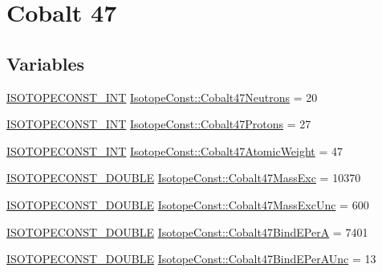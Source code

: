\hypertarget{group___isotope_const-_cobalt-_co47}{}\section{Cobalt 47}
\label{group___isotope_const-_cobalt-_co47}
\subsection*{Variables}
\begin{DoxyCompactItemize}
\item 
\mbox{\hyperlink{group___isotope_const-_macros_ga5f18360b3e99483a35c32d789e62621c}{I\+S\+O\+T\+O\+P\+E\+C\+O\+N\+S\+T\+\_\+\+I\+NT}} \mbox{\hyperlink{group___isotope_const-_cobalt-_co47_gabe5a80fa1a292359e2497542a5131662}{Isotope\+Const\+::\+Cobalt47\+Neutrons}} = 20
\item 
\mbox{\hyperlink{group___isotope_const-_macros_ga5f18360b3e99483a35c32d789e62621c}{I\+S\+O\+T\+O\+P\+E\+C\+O\+N\+S\+T\+\_\+\+I\+NT}} \mbox{\hyperlink{group___isotope_const-_cobalt-_co47_gae44eb3ae1e4d620cf5007c723a5c1a70}{Isotope\+Const\+::\+Cobalt47\+Protons}} = 27
\item 
\mbox{\hyperlink{group___isotope_const-_macros_ga5f18360b3e99483a35c32d789e62621c}{I\+S\+O\+T\+O\+P\+E\+C\+O\+N\+S\+T\+\_\+\+I\+NT}} \mbox{\hyperlink{group___isotope_const-_cobalt-_co47_ga0cd20710c3cc124bdc234155502d5517}{Isotope\+Const\+::\+Cobalt47\+Atomic\+Weight}} = 47
\item 
\mbox{\hyperlink{group___isotope_const-_macros_ga8f45a7272ce02c0b4c65c44636ed719a}{I\+S\+O\+T\+O\+P\+E\+C\+O\+N\+S\+T\+\_\+\+D\+O\+U\+B\+LE}} \mbox{\hyperlink{group___isotope_const-_cobalt-_co47_ga5d0db8d1c4f59e484e0afa3cfc67a5db}{Isotope\+Const\+::\+Cobalt47\+Mass\+Exc}} = 10370
\item 
\mbox{\hyperlink{group___isotope_const-_macros_ga8f45a7272ce02c0b4c65c44636ed719a}{I\+S\+O\+T\+O\+P\+E\+C\+O\+N\+S\+T\+\_\+\+D\+O\+U\+B\+LE}} \mbox{\hyperlink{group___isotope_const-_cobalt-_co47_gac3c07a624f4956b152e29c4f613d4f7d}{Isotope\+Const\+::\+Cobalt47\+Mass\+Exc\+Unc}} = 600
\item 
\mbox{\hyperlink{group___isotope_const-_macros_ga8f45a7272ce02c0b4c65c44636ed719a}{I\+S\+O\+T\+O\+P\+E\+C\+O\+N\+S\+T\+\_\+\+D\+O\+U\+B\+LE}} \mbox{\hyperlink{group___isotope_const-_cobalt-_co47_gaf432045e546472ff57eb8df8d2241fea}{Isotope\+Const\+::\+Cobalt47\+Bind\+E\+PerA}} = 7401
\item 
\mbox{\hyperlink{group___isotope_const-_macros_ga8f45a7272ce02c0b4c65c44636ed719a}{I\+S\+O\+T\+O\+P\+E\+C\+O\+N\+S\+T\+\_\+\+D\+O\+U\+B\+LE}} \mbox{\hyperlink{group___isotope_const-_cobalt-_co47_ga8c2175c84b347ced59d1a86c130ad3e4}{Isotope\+Const\+::\+Cobalt47\+Bind\+E\+Per\+A\+Unc}} = 13

\end{DoxyCompactItemize}

